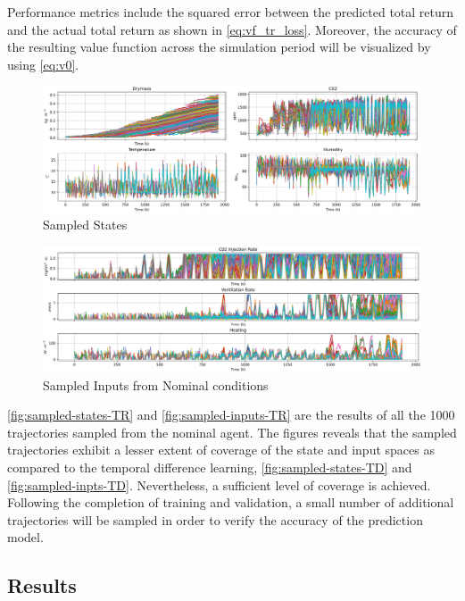Performance metrics include the squared error between the predicted total return and the actual total return as shown in \autoref{eq:vf_tr_loss}. Moreover, the accuracy of the resulting value function across the simulation period will be visualized by using \autoref{eq:v0}.


\begin{figure}[H]
    \centering
    \includegraphics[width = \textwidth]{figures/sampled_states_TR-eps-converted-to.png}
    \caption{Sampled States}
    \label{fig:sampled-states-TR}
\end{figure}


\begin{figure}[H]
    \centering
    \includegraphics[width = \textwidth]{figures/sampled_inputs_TR-eps-converted-to.png}
    \caption{Sampled Inputs from Nominal conditions}
    \label{fig:sampled-inputs-TR}
\end{figure}

\autoref{fig:sampled-states-TR} and \autoref{fig:sampled-inputs-TR} are the results of all the 1000 trajectories sampled from the nominal agent. The figures reveals that the sampled trajectories exhibit a lesser extent of coverage of the state and input spaces as compared to the temporal difference learning, \autoref{fig:sampled-states-TD} and \autoref{fig:sampled-inpts-TD}. Nevertheless, a sufficient level of coverage is achieved. Following the completion of training and validation, a small number of additional trajectories will be sampled in order to verify the accuracy of the prediction model.


\subsection{Results}

